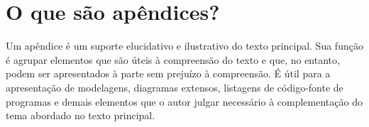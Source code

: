 \chapter{O que são apêndices?}
\label{cap:apendice}

Um apêndice é um suporte elucidativo e ilustrativo do texto principal. Sua função é agrupar 
elementos que são úteis à compreensão do texto e que, no entanto, podem ser apresentados
à parte sem prejuízo à compreensão. É útil para a apresentação de modelagens, diagramas
extensos, listagens de código-fonte de programas e demais elementos que o autor julgar
necessário à complementação do tema abordado no texto principal.
